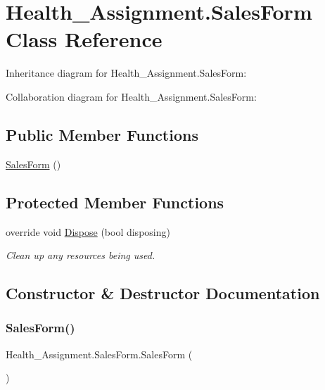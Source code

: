 \hypertarget{class_health___assignment_1_1_sales_form}{}\section{Health\+\_\+\+Assignment.\+Sales\+Form Class Reference}
\label{class_health___assignment_1_1_sales_form}


Inheritance diagram for Health\+\_\+\+Assignment.\+Sales\+Form\+:


Collaboration diagram for Health\+\_\+\+Assignment.\+Sales\+Form\+:
\subsection*{Public Member Functions}
\begin{DoxyCompactItemize}
\item 
\hyperlink{class_health___assignment_1_1_sales_form_a8c1f418d877fafb51efa15c9345591f2}{Sales\+Form} ()
\end{DoxyCompactItemize}
\subsection*{Protected Member Functions}
\begin{DoxyCompactItemize}
\item 
override void \hyperlink{class_health___assignment_1_1_sales_form_a7adf571b90732126b756e48eeb360586}{Dispose} (bool disposing)
\begin{DoxyCompactList}\small\item\em Clean up any resources being used. \end{DoxyCompactList}\end{DoxyCompactItemize}


\subsection{Constructor \& Destructor Documentation}
\mbox{\label{class_health___assignment_1_1_sales_form_a8c1f418d877fafb51efa15c9345591f2}} 
\subsubsection{\texorpdfstring{Sales\+Form()}{SalesForm()}}
{\footnotesize\ttfamily Health\+\_\+\+Assignment.\+Sales\+Form.\+Sales\+Form (\begin{DoxyParamCaption}{ }\end{DoxyParamCaption})\hspace{0.3cm}{\ttfamily [inline]}}



